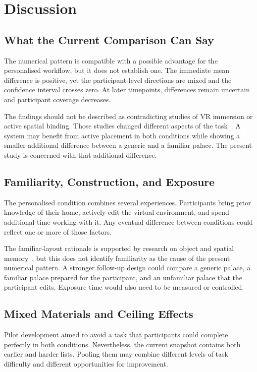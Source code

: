 \section{Discussion}
\subsection{What the Current Comparison Can Say}
The numerical pattern is compatible with a possible advantage for the personalised workflow, but it does not establish one. The immediate mean difference is positive, yet the participant-level directions are mixed and the confidence interval crosses zero. At later timepoints, differences remain uncertain and participant coverage decreases.

The findings should not be described as contradicting studies of VR immersion or active spatial binding. Those studies changed different aspects of the task~\cite{krokos2019,reggente2020}. A system may benefit from active placement in both conditions while showing a smaller additional difference between a generic and a familiar palace. The present study is concerned with that additional difference.

\subsection{Familiarity, Construction, and Exposure}
The personalised condition combines several experiences. Participants bring prior knowledge of their home, actively edit the virtual environment, and spend additional time working with it. Any eventual difference between conditions could reflect one or more of those factors.

The familiar-layout rationale is supported by research on object and spatial memory~\cite{merriman2016}, but this does not identify familiarity as the cause of the present numerical pattern. A stronger follow-up design could compare a generic palace, a familiar palace prepared for the participant, and an unfamiliar palace that the participant edits. Exposure time would also need to be measured or controlled.

\subsection{Mixed Materials and Ceiling Effects}
Pilot development aimed to avoid a task that participants could complete perfectly in both conditions. Nevertheless, the current snapshot contains both earlier and harder lists. Pooling them may combine different levels of task difficulty and different opportunities for improvement.

